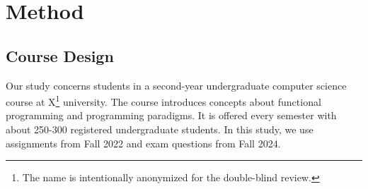 \section{Method}







\subsection{Course Design}

Our study concerns students in a second-year undergraduate computer science course at X\footnote{The name is intentionally anonymized for the double-blind review.} university. The course introduces concepts about functional programming and programming paradigms. It is offered every semester with about 250-300 registered undergraduate students. In this study, we use assignments from Fall 2022 and exam questions from Fall 2024.

